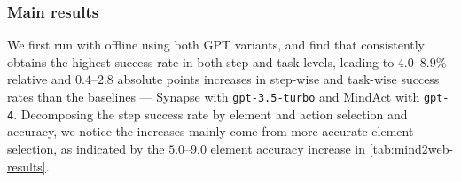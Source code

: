 \subsubsection{Main results}

\begin{table}
\small
\vspace{-8mm}
\caption{\awm offline results on Mind2Web cross-task dataset. Elem Acc and SR are short for element accuracy and success rate. We footnote the GPT variant used by each method, \texttt{3.5} and \texttt{4} stands for \texttt{gpt-3.5-turbo} and \texttt{gpt-4}, respectively. We highlight the best result within the same model variant.}
\vspace{1mm}
\label{tab:mind2web-results}
\vspace{-4mm}
\end{table}

We first run with \awm offline using both GPT variants, and find that \awm consistently obtains the highest success rate in both step and task levels, leading to $4.0$--$8.9$\% relative and $0.4$--$2.8$ absolute points increases in step-wise and task-wise success rates than the baselines --- Synapse with \texttt{gpt-3.5-turbo} and MindAct with \texttt{gpt-4}. 
%
Decomposing the step success rate by element and action selection and accuracy, we notice the increases mainly come from more accurate element selection, as indicated by the $5.0$--$9.0$ element accuracy increase in \autoref{tab:mind2web-results}. 

